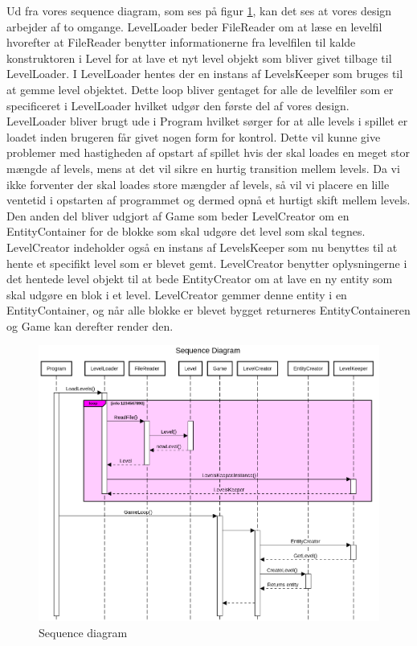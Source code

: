 \newpage

Ud fra vores sequence diagram, som ses på figur \ref{seqDig}, kan det ses at vores design arbejder af to omgange. LevelLoader beder FileReader om at læse en levelfil hvorefter at FileReader benytter informationerne fra levelfilen til kalde konstruktoren i Level for at lave et nyt level objekt som bliver givet tilbage til LevelLoader. I LevelLoader hentes der en instans af LevelsKeeper som bruges til at gemme level objektet. Dette loop bliver gentaget for alle de levelfiler som er specificeret i LevelLoader hvilket udgør den første del af vores design. LevelLoader bliver brugt ude i Program hvilket sørger for at alle levels i spillet er loadet inden brugeren får givet nogen form for kontrol. Dette vil kunne give problemer med hastigheden af opstart af spillet hvis der skal loades en meget stor mængde af levels, mens at det vil sikre en hurtig transition mellem levels. Da vi ikke forventer der skal loades store mængder af levels, så vil vi placere en lille ventetid i opstarten af programmet og dermed opnå et hurtigt skift mellem levels. \\
Den anden del bliver udgjort af Game som beder LevelCreator om en EntityContainer for de blokke som skal udgøre det level som skal tegnes. LevelCreator indeholder også en instans af LevelsKeeper som nu benyttes til at hente et specifikt level som er blevet gemt. LevelCreator benytter oplysningerne i det hentede level objekt til at bede EntityCreator om at lave en ny entity som skal udgøre en blok i et level. LevelCreator gemmer denne entity i en EntityContainer, og når alle blokke er blevet bygget returneres EntityContaineren og Game kan derefter render den.\\
\begin{figure}
  \includegraphics[width=\linewidth]{latex/Images/SequenceDiagram.png}
  \caption{Sequence diagram}
  \label{seqDig}
\end{figure}
